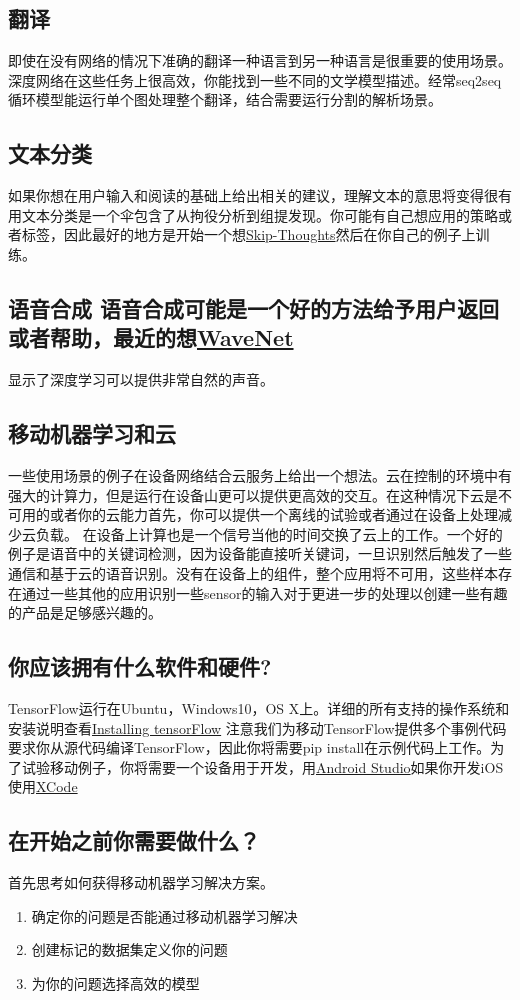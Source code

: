 \subsection{翻译}
即使在没有网络的情况下准确的翻译一种语言到另一种语言是很重要的使用场景。深度网络在这些任务上很高效，你能找到一些不同的文学模型描述。经常seq2seq循环模型能运行单个图处理整个翻译，结合需要运行分割的解析场景。
\subsection{文本分类}
如果你想在用户输入和阅读的基础上给出相关的建议，理解文本的意思将变得很有用文本分类是一个伞包含了从拘役分析到组提发现。你可能有自己想应用的策略或者标签，因此最好的地方是开始一个想\href{https://github.com/tensorflow/models/tree/master/skip_thoughts/}{Skip-Thoughts}然后在你自己的例子上训练。
\subsection{{语音合成}
语音合成可能是一个好的方法给予用户返回或者帮助，最近的想\href{https://deepmind.com/blog/wavenet-generative-model-raw-audio/}{WaveNet}}显示了深度学习可以提供非常自然的声音。
\subsection{移动机器学习和云}
一些使用场景的例子在设备网络结合云服务上给出一个想法。云在控制的环境中有强大的计算力，但是运行在设备山更可以提供更高效的交互。在这种情况下云是不可用的或者你的云能力首先，你可以提供一个离线的试验或者通过在设备上处理减少云负载。
在设备上计算也是一个信号当他的时间交换了云上的工作。一个好的例子是语音中的关键词检测，因为设备能直接听关键词，一旦识别然后触发了一些通信和基于云的语音识别。没有在设备上的组件，整个应用将不可用，这些样本存在通过一些其他的应用识别一些sensor的输入对于更进一步的处理以创建一些有趣的产品是足够感兴趣的。
\subsection{你应该拥有什么软件和硬件?}
TensorFlow运行在Ubuntu，Windows10，OS X上。详细的所有支持的操作系统和安装说明查看\href{https://www.tensorflow.org/install/index?hl=zh-cn}{Installing tensorFlow}
注意我们为移动TensorFlow提供多个事例代码要求你从源代码编译TensorFlow，因此你将需要pip install在示例代码上工作。为了试验移动例子，你将需要一个设备用于开发，用\href{https://developer.android.com/studio/install.html?hl=zh-cn}{Android Studio}如果你开发iOS使用\href{https://developer.apple.com/xcode/}{XCode}
\subsection{在开始之前你需要做什么？}
首先思考如何获得移动机器学习解决方案。
\begin{enumerate}
    \item 确定你的问题是否能通过移动机器学习解决
    \item 创建标记的数据集定义你的问题
    \item 为你的问题选择高效的模型
\end{enumerate}
